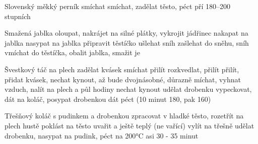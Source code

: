 \documentclass[12pt,a4paper]{article}
\begin{document}
\begin{recipe}{Slovenský měkký perník}
   smíchat
   smíchat, zadělat těsto, péct pří 180--200 stupních
\end{recipe}
\newpage

\begin{recipe}{Smažená jablka}
   oloupat, nakrájet na silné plátky, vykrojit jádřinec
   nakapat na jablka
   nasypat na jablka
   připravit těstíčko
   ušlehat sníh
   zašlehat do sněhu, sníh vmíchat do těstíčka, obalit jablka, smažit je
\end{recipe}
\newpage

\begin{recipe}{Švestkový táč na plech}
   zadělat kvásek
   smíchat
   přilít
   rozkvedlat, přilít
   přilít, přidat kvásek, nechat kynout, až bude dvoj\-ná\-sob\-né,
    důrazně míchat, vyhnat vzduch, nalít na plech a půl hodiny nechat kynout 
   udělat drobenku
   vypeckovat, dát na koláč, posypat drobenkou dát péct (10 minut 180, pak 160)
\end{recipe}
\newpage

\begin{recipe}{Třešňový koláč s pudinkem a drobenkou}
   zpracovat v hladké těsto, rozetřít na plech
   hustě poklást na těsto
   uvařit a ještě teplý (ne vařící) vylít na třešně
   udělat drobenku, nasypat na pudink, péct na 200°C asi 30 - 35 minut
\end{recipe}
\newpage
\end{document}

